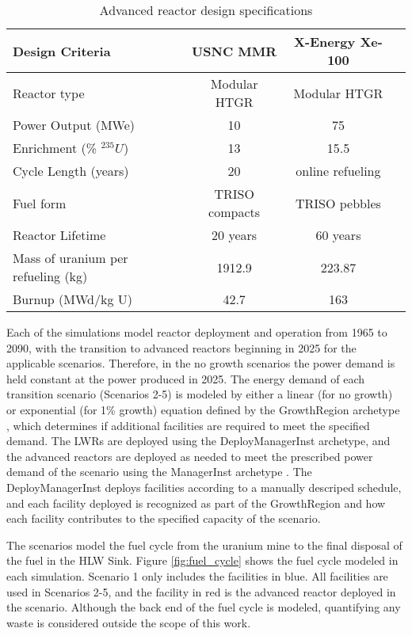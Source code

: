 \begin{table}[ht]
        \caption{Advanced reactor design specifications}
        \label{tab:reactor_summary}
        \begin{tabular}{l c c c }
            \hline
            Design Criteria & \gls{USNC} \gls{MMR} \cite{mitchell_usnc_2020}& 
                X-Energy Xe-100 \cite{harlan_x-energy_2018,hussain_advances_2018} \\\hline
            Reactor type & Modular HTGR & Modular HTGR \\
            Power Output (MWe) & 10 & 75 \\
            Enrichment (\% $^{235}U$) & 13 & 15.5 \\
            Cycle Length (years) & 20 & online refueling\\
            Fuel form & \gls{TRISO} compacts & \gls{TRISO} pebbles\\
            Reactor Lifetime & 20 years & 60 years \\
            Mass of uranium per refueling (kg) & 1912.9 & 223.87 \\
            Burnup (MWd/kg U) & 42.7 & 163 \\
            \hline
        \end{tabular}
    \end{table}

Each of the simulations model reactor deployment and operation from 1965 to 
2090, with the transition to advanced reactors beginning 
in 2025 for the applicable scenarios. Therefore, in the no growth scenarios 
the power demand is held constant 
at the power produced in 2025. The energy demand of each transition scenario 
(Scenarios 2-5) is modeled by either a linear (for no growth) or 
exponential (for 1\% growth) equation defined by the \Cycamore GrowthRegion
archetype \cite{huff_fundamental_2016}, which determines if additional 
facilities are required to meet the specified demand. The \glspl{LWR} are deployed 
using the \Cycamore DeployManagerInst archetype, and the 
advanced reactors are deployed as needed to meet the prescribed power demand 
of the scenario using the \Cycamore ManagerInst archetype 
\cite{huff_fundamental_2016}. The \Cycamore DeployManagerInst deploys facilities 
according to a manually descriped schedule, and each facility deployed is 
recognized as part of the \Cycamore GrowthRegion and how each facility contributes 
to the specified capacity of the scenario. 

The scenarios model the fuel cycle from the uranium mine to the final 
disposal of the fuel in the HLW Sink.  Figure 
\ref{fig:fuel_cycle} shows the fuel cycle modeled in each simulation. Scenario 
1 only includes the facilities in blue. All facilities are used in Scenarios 
2-5, and the facility in red is the advanced reactor deployed in the 
scenario. Although the back end of the fuel 
cycle is modeled, quantifying any waste is considered outside the 
scope of this work. 

